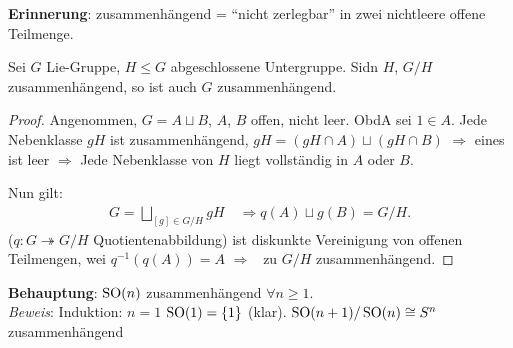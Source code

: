 \textbf{Erinnerung}: zusammenhängend = "`nicht zerlegbar"' in zwei nichtleere offene Teilmenge.

\begin{lemma}
	Sei $G$ Lie-Gruppe, $H\le G$ abgeschlossene Untergruppe. Sidn $H$, $G\slash H$ zusammenhängend, so ist auch $G$ zusammenhängend.
\end{lemma}

\begin{proof}
	Angenommen, $G= A\sqcup B$, $A$, $B$ offen, nicht leer. ObdA sei $1\in A$. Jede Nebenklasse $gH$ ist zusammenhängend, $gH = (gH\cap A)\sqcup (gH\cap B)$ $\Rightarrow$ eines ist leer $\Rightarrow$ Jede Nebenklasse von $H$ liegt vollständig in $A$ oder $B$.
	
	Nun gilt:\begin{align*}
		G = \bigsqcup_{[g]\in G\slash H} gH \quad\Rightarrow q(A)\sqcup g(B) = G\slash H.
	\end{align*}
	($q\colon G\twoheadrightarrow G\slash H$ Quotientenabbildung) ist diskunkte Vereinigung von offenen Teilmengen, wei $q^{-1}(q(A)) = A$ $\Rightarrow$ \Lightning~zu $G\slash H$ zusammenhängend.
\end{proof}

\textbf{Behauptung}: $\operatorname{SO}(n)$ zusammenhängend $\forall n\ge 1$.\\
\emph{Beweis}: Induktion: $n=1$ $\operatorname{SO}(1) = \{1\}$ (klar). $\operatorname{SO}(n+1)\slash \operatorname{SO}(n)\cong S^n$ zusammenhängend